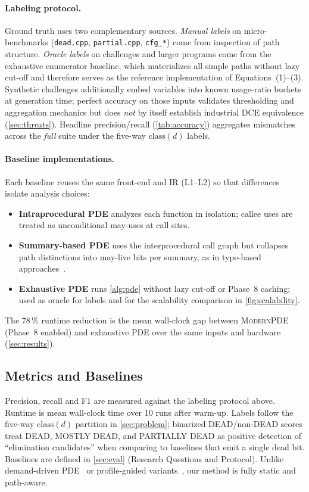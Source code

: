 \documentclass[acmsmall,screen,review,anonymous]{acmart}
\begin{document}
\paragraph{Labeling protocol.}
Ground truth uses two complementary sources. \emph{Manual labels} on micro-benchmarks (\texttt{dead.cpp}, \texttt{partial.cpp}, \texttt{cfg\_*}) come from inspection of path structure. \emph{Oracle labels} on challenges and larger programs come from the exhaustive enumerator baseline, which materializes all simple paths without lazy cut-off and therefore serves as the reference implementation of Equations~(1)--(3). Synthetic challenges additionally embed variables into known usage-ratio buckets at generation time; perfect accuracy on those inputs validates thresholding and aggregation mechanics but does \emph{not} by itself establish industrial DCE equivalence (\autoref{sec:threats}). Headline precision/recall (\autoref{tab:accuracy}) aggregates mismatches across the \emph{full} suite under the five-way $\mathrm{class}(d)$ labels.

\paragraph{Baseline implementations.}
Each baseline reuses the same front-end and IR (L1--L2) so that differences isolate analysis choices:
\begin{itemize}[leftmargin=*,itemsep=1pt]
\item \textbf{Intraprocedural PDE} analyzes each function in isolation; callee uses are treated as unconditional may-uses at call sites.
\item \textbf{Summary-based PDE} uses the interprocedural call graph but collapses path distinctions into may-live bits per summary, as in type-based approaches~\cite{chatterjee2005interprocedural}.
\item \textbf{Exhaustive PDE} runs \autoref{alg:pde} without lazy cut-off or Phase~8 caching; used as oracle for labels and for the scalability comparison in \autoref{fig:scalability}.
\end{itemize}
The 78\,\% runtime reduction is the mean wall-clock gap between \textsc{ModernPDE} (Phase~8 enabled) and exhaustive PDE over the same inputs and hardware (\autoref{sec:results}).

\subsection{Metrics and Baselines}
Precision, recall and F1 are measured against the labeling protocol above. Runtime is mean wall-clock time over 10 runs after warm-up. Labels follow the five-way $\mathrm{class}(d)$ partition in \autoref{sec:problem}; binarized DEAD/non-DEAD scores treat DEAD, MOSTLY DEAD, and PARTIALLY DEAD as positive detection of ``elimination candidates'' when comparing to baselines that emit a single dead bit. Baselines are defined in \autoref{sec:eval} (Research Questions and Protocol). Unlike demand-driven PDE~\cite{takimoto2012demand} or profile-guided variants~\cite{pathprofile2025}, our method is fully static and path-aware.
\end{document}
